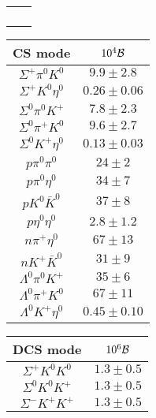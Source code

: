 \begin{table}[h]
{\begin{tabular}{|c|c|}
			&\\
			&\\
			&\\
			&\\
			\hline
		\end{tabular}
		\begin{tabular}{|c|c|}
			\hline
			CS mode  & $10^{4}{\cal B}$\\
			\hline
			$ \Sigma^{+} \pi^{0} K^{0} $ & $     9.9 \pm     2.8$ \\
			$\Sigma^{+} K^{0} \eta^{0} $ & $     0.26 \pm     0.06 $ \\
			$ \Sigma^{0} \pi^{0} K^{+} $ & $     7.8 \pm     2.3 $ \\
			$ \Sigma^{0} \pi^{+} K^{0} $ & $     9.6 \pm     2.7 $ \\
			$ \Sigma^{0} K^{+} \eta^{0} $ & $     0.13 \pm     0.03 $ \\
			$ p \pi^{0} \pi^{0} $ & $    24 \pm     2 $ \\
			$ p \pi^{0} \eta^{0} $ & $    34 \pm     7 $ \\
			$ p K^{0} \bar{K}^{0} $ & $    37 \pm     8 $ \\
			$ p \eta^{0} \eta^{0} $ & $     2.8 \pm     1.2$ \\
			$ n \pi^{+} \eta^{0} $ & $    67 \pm    13 $ \\
			$n K^{+} \bar{K}^{0} $ & $    31 \pm     9 $ \\
			$ \Lambda^{0} \pi^{0} K^{+}$ & $    35 \pm     6 $ \\
			$\Lambda^{0} \pi^{+} K^{0} $ & $    67 \pm    11 $ \\
			$ \Lambda^{0} K^{+} \eta^{0} $ & $     0.45 \pm     0.10 $ \\
			\hline
		\end{tabular}
		\begin{tabular}{|c|c|}
			\hline
			DCS mode&$10^{6}{\cal B}$\\
			\hline
			$ \Sigma^{+} K^{0} K^{0} $ & $     1.3 \pm     0.5 $ \\
			$ \Sigma^{0} K^{0} K^{+}$ & $     1.3 \pm     0.5 $ \\
			$ \Sigma^{-} K^{+} K^{+} $ & $     1.3 \pm     0.5 $ \\

\end{tabular}}
\end{table}
